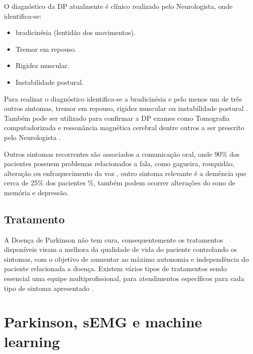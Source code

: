 O diagnóstico da DP atualmente é clínico realizado pelo Neurologista, onde identifica-se:
\begin{itemize}
    \item bradicinésia (lentidão dos movimentos).
    \item Tremor em repouso.
    \item Rigidez muscular.
    \item Instabilidade postural.
\end{itemize}

Para realizar o diagnóstico identifica-se a bradicinésia e pelo menos um de três outros sintomas, tremor em repouso, rigidez muscular ou instabilidade postural \cite{gago2014manual}. Também pode ser utilizado para confirmar a DP exames como Tomografia computadorizada e ressonância magnética cerebral dentre outros a ser prescrito pelo Neurologista \cite{gago2014manual}.

Outros sintomas recorrentes são associados a comunicação oral, onde 90\% dos pacientes possuem problemas relacionados a fala, como gagueira, rouquidão, alteração ou enfraquecimento da voz \cite{zarzur2010laryngeal}, outro sintoma relevante é a demência que cerca de 25\% dos pacientes \cite{pamplona1996demencia}\%, também podem ocorrer alterações do sono de memória e depressão\cite{barbosa2005parkinsons}.

\subsection{Tratamento}
A Doença de Parkinson não tem cura, consequentemente os tratamentos disponíveis visam a melhora da qualidade de vida do paciente controlando os sintomas, com o objetivo de aumentar ao máximo autonomia e independência do paciente relacionada a doença. Existem vários tipos de tratamentos sendo essencial uma equipe multiprofissional, para atendimentos específicos para cada tipo de sintoma apresentado \cite{saito2011doencca}.

\section{Parkinson, sEMG e machine learning}


